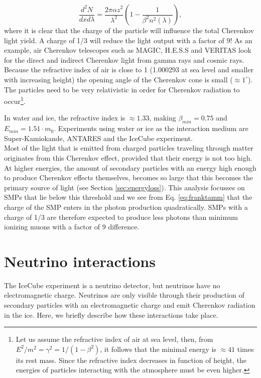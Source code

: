 \begin{equation}
\label{eq:franktamm}
\frac{d^2N}{dx d\lambda}  = \frac{2\pi \alpha z^2}{\lambda^2} \left(1- \frac{1}{\beta^2 n^2 \left(\lambda \right)} \right),
\end{equation}
where it is clear that the charge of the particle will influence the total Cherenkov light yield. A charge of 1/3 will reduce the light output with a factor of 9!
As an example, air Cherenkov telescopes such as MAGIC, H.E.S.S and VERITAS look for the direct and indirect Cherenkov light from gamma rays and cosmic rays. Because the refractive index of air is close to 1 (1.000293 at sea level and smaller with increasing height) the opening angle of the Cherenkov cone is small ($\approx 1^{\circ}$). The particles need to be very relativistic in order for Cherenkov radiation to occur\footnote{Let us assume the refractive index of air at sea level, then, from $E^2/m^2 = \gamma^2 = 1/(1-\beta^2)$, it follows that the minimal energy is $\approx 41$ times its rest mass. Since the refractive index decreases in function of height, the energies of particles interacting with the atmosphere must be even higher.}.

In water and ice, the refractive index is $\approx 1.33$, making $\beta_{min} = 0.75$ and $E_{min} = 1.51 \cdot m_0$. Experiments using water or ice as the interaction medium are Super-Kamiokande, ANTARES and the IceCube experiment.\\

\noindent Most of the light that is emitted from charged particles traveling through matter originates from this Cherenkov effect, provided that their energy is not too high. At higher energies, the amount of secondary particles with an energy high enough to produce Cherenkov effects themselves, becomes so large that this becomes the primary source of light (see Section \ref{sec:energyloss}). This analysis focusses on SMPs that lie below this threshold and we see from Eq. \ref{eq:franktamm} that the charge of the SMP enters in the photon production quadratically. SMPs with a charge of 1/3 are therefore expected to produce less photons than minimum ionizing muons with a factor of 9 difference.

\section{Neutrino interactions}
\label{sec:neutrinointeractions}
The IceCube experiment is a neutrino detector, but neutrinos have no electromagnetic charge. Neutrinos are only visible through their production of secondary particles with an electromagnetic charge and emit Cherenkov radiation in the ice. Here, we briefly describe how these interactions take place.\\

